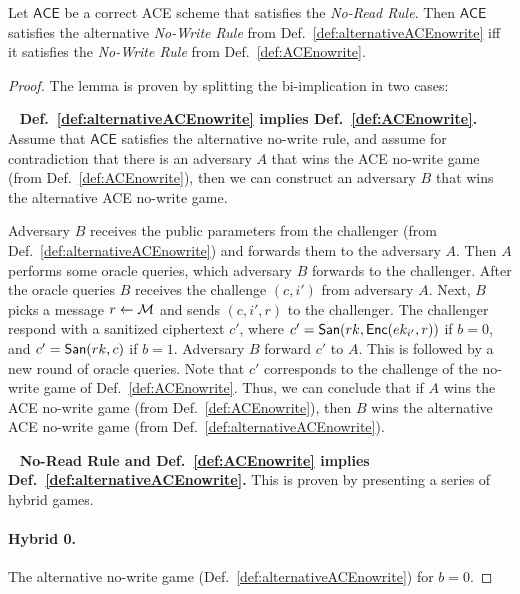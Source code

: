 \documentclass{llncs}
\begin{document}
\newcommand{\ACEscheme}{\mathsf{ACE}}
\begin{lem} \label{lem:nowrite_equiv}
Let $\ACEscheme$ be a correct ACE scheme that satisfies the \emph{No-Read Rule}. Then $\ACEscheme$ satisfies the alternative \emph{No-Write Rule} from Def.~\ref{def:alternativeACEnowrite} iff it satisfies the \emph{No-Write Rule} from Def.~\ref{def:ACEnowrite}.
\end{lem}

\setcounter{claimcounter}{0}
\begin{proof}
The lemma is proven by splitting the bi-implication in two cases:

\ \newline
\noindent\textbf{Def.~\ref{def:alternativeACEnowrite} implies Def.~\ref{def:ACEnowrite}.}
Assume that $\ACEscheme$ satisfies the alternative no-write rule, and assume for contradiction that there is an adversary $A$ that wins the ACE no-write game (from Def.~\ref{def:ACEnowrite}), then we can construct an adversary $B$ that wins the alternative ACE no-write game.

Adversary $B$ receives the public parameters from the challenger (from Def.~\ref{def:alternativeACEnowrite}) and forwards them to the adversary $A$. Then $A$ performs some oracle queries, which adversary $B$ forwards to the challenger. After the oracle queries $B$ receives the challenge $(c,i')$ from adversary $A$. Next, $B$ picks a message $r \leftarrow \mathcal{M}$ and sends $(c,i',r)$ to the challenger. 
The challenger respond with a sanitized ciphertext $c'$, where $c' = \mathsf{San}(rk,\mathsf{Enc}(ek_{i'},r))$ if $b=0$, and $c' = \mathsf{San}(rk,c)$ if $b=1$.
Adversary $B$ forward $c'$ to $A$. This is followed by a new round of oracle queries. Note that $c'$ corresponds to the challenge of the no-write game of Def.~\ref{def:ACEnowrite}.
Thus, we can conclude that if $A$ wins the ACE no-write game (from Def.~\ref{def:ACEnowrite}), then $B$ wins the alternative ACE no-write game (from Def.~\ref{def:alternativeACEnowrite}).

\ \newline
\noindent\textbf{No-Read Rule and Def.~\ref{def:ACEnowrite} implies Def.~\ref{def:alternativeACEnowrite}.}
This is proven by presenting a series of hybrid games.

\paragraph{Hybrid 0.} The alternative no-write game (Def.~\ref{def:alternativeACEnowrite}) for $b=0$.


\end{proof}
\end{document}
